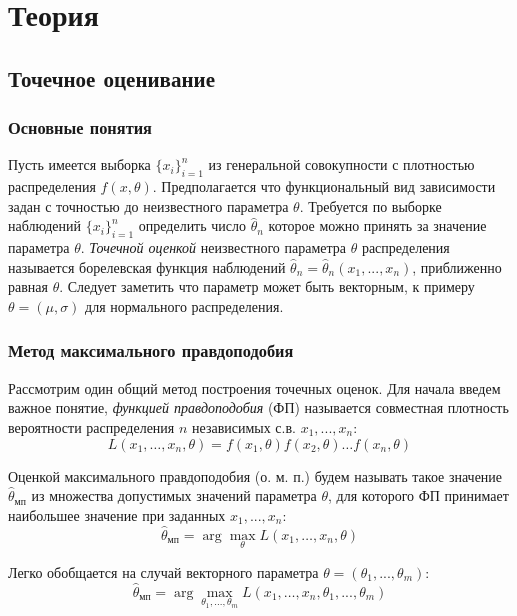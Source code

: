 \documentclass[12pt,a4paper]{article}
\begin{document}
\section{Теория}
\subsection{Точечное оценивание}
\subsubsection{Основные понятия}
Пусть имеется выборка $\{x_i\}_{i=1}^n$ из генеральной совокупности с плотностью распределения $f(x,\theta)$. Предполагается что функциональный вид зависимости задан с точностью до неизвестного параметра $\theta$. Требуется по выборке наблюдений $\{x_i\}_{i=1}^n$ определить число $\widehat{\theta}_n$ которое можно принять за значение параметра $\theta$. \textit{Точечной оценкой} неизвестного параметра $\theta$ распределения называется борелевская функция наблюдений $\widehat{\theta}_n = \widehat{\theta}_n(x_1, ..., x_n)$, приближенно равная $\theta$. Следует заметить что параметр может быть векторным, к примеру $\theta = (\mu, \sigma)$ для нормального распределения.

\subsubsection{Метод максимального правдоподобия}
Рассмотрим один общий метод построения точечных оценок. Для начала введем важное понятие, \textit{функцией правдоподобия} (ФП) называется совместная плотность вероятности распределения $n$ независимых с.в. $x_1, ..., x_n$:
\begin{equation}
	L\left(x_{1}, \ldots, x_{n}, \theta\right)=f\left(x_{1}, \theta\right) f\left(x_{2}, \theta\right) \ldots f\left(x_{n}, \theta\right)
\end{equation}

Оценкой максимального правдоподобия (о. м. п.) будем называть такое значение $\widehat{\theta}_{\text{мп}}$ из множества допустимых значений параметра $\theta$, для которого ФП принимает наибольшее значение при заданных $x_1, ..., x_n$:
\begin{equation}
	\widehat{\theta}_{\text{мп}}=\arg \max _{\theta} L\left(x_{1}, \ldots, x_{n}, \theta\right)
\end{equation}

Легко обобщается на случай векторного параметра $\theta = (\theta_1, ..., \theta_m)$:
\begin{equation}
	\widehat{\theta}_{\text{мп}}=\arg \max _{\theta_1, ..., \theta_m} L\left(x_{1}, \ldots, x_{n}, \theta_1, ..., \theta_m\right)
\end{equation}
\end{document}
